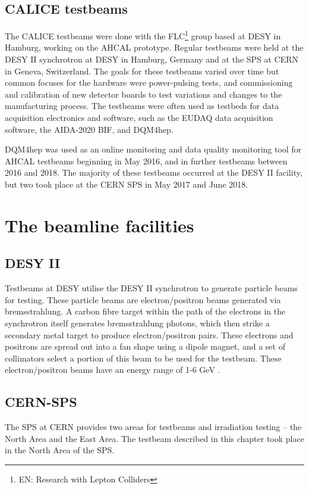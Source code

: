 \subsection*{CALICE testbeams}
The \acrshort{CALICE} testbeams were done with the \acrfull{FLC}\footnote{EN: Research with Lepton Colliders} group based at \acrshort{DESY} in Hamburg, working on the \acrshort{AHCAL} prototype. Regular testbeams were held at the DESY II synchrotron at \acrshort{DESY} in Hamburg, Germany and at the \acrfull{SPS} at \acrshort{CERN} in Geneva, Switzerland. The goals for these testbeams varied over time but common focuses for the hardware were power-pulsing tests, and commissioning and calibration of new detector boards to test variations and changes to the manufacturing process. The testbeams were often used as testbeds for data acquisition electronics and software, such as the \acrshort{EUDAQ} data acquisition software, the \acrshort{AIDA}-2020 \acrfull{BIF}, and \acrshort{DQM4hep}.

\acrshort{DQM4hep} was used as an online monitoring and data quality monitoring tool for \acrshort{AHCAL} testbeams beginning in May 2016, and in further testbeams between 2016 and 2018. The majority of these testbeams occurred at the DESY II facility, but two took place at the \acrshort{CERN} \acrshort{SPS} in May 2017 and June 2018.

\section{The beamline facilities}

\subsection{DESY II}
Testbeams at \acrshort{DESY} utilise the DESY II synchrotron to generate particle beams for testing. These particle beams are electron/positron beams generated via bremsstrahlung. A carbon fibre target within the path of the electrons in the synchrotron itself generates bremsstrahlung photons, which then strike a secondary metal target to produce electron/positron pairs. These electrons and positrons are spread out into a fan shape using a dipole magnet, and a set of collimators select a portion of this beam to be used for the testbeam. These electron/positron beams have an energy range of 1-6 GeV \cite{testbeams-desy}.

\subsection{CERN-SPS}
The \acrfull{SPS} at \acrshort{CERN} provides two areas for testbeams and irradiation testing -- the North Area and the East Area. The testbeam described in this chapter took place in the North Area of the \acrshort{SPS}. 


